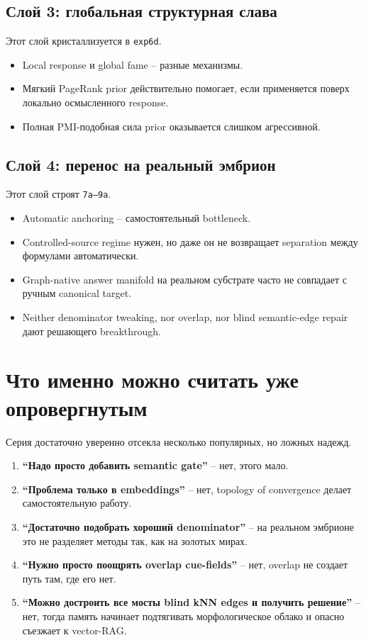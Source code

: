 \subsection{Слой 3: глобальная структурная слава}

Этот слой кристаллизуется в \texttt{exp6d}.

\begin{itemize}[leftmargin=2em]
\item Local response и global fame -- разные механизмы.
\item Мягкий PageRank prior действительно помогает, если применяется поверх
локально осмысленного response.
\item Полная PMI-подобная сила prior оказывается слишком агрессивной.
\end{itemize}

\subsection{Слой 4: перенос на реальный эмбрион}

Этот слой строят \texttt{7a--9a}.

\begin{itemize}[leftmargin=2em]
\item Automatic anchoring -- самостоятельный bottleneck.
\item Controlled-source regime нужен, но даже он не возвращает separation между
формулами автоматически.
\item Graph-native answer manifold на реальном субстрате часто не совпадает с
ручным canonical target.
\item Neither denominator tweaking, nor overlap, nor blind semantic-edge repair
дают решающего breakthrough.
\end{itemize}

\section{Что именно можно считать уже опровергнутым}

Серия достаточно уверенно отсекла несколько популярных, но ложных надежд.

\begin{enumerate}[leftmargin=2em]
\item \textbf{``Надо просто добавить semantic gate''} -- нет, этого мало.
\item \textbf{``Проблема только в embeddings''} -- нет, topology of convergence
делает самостоятельную работу.
\item \textbf{``Достаточно подобрать хороший denominator''} -- на реальном
эмбрионе это не разделяет методы так, как на золотых мирах.
\item \textbf{``Нужно просто поощрять overlap cue-fields''} -- нет, overlap не
создает путь там, где его нет.
\item \textbf{``Можно достроить все мосты blind kNN edges и получить решение''}
-- нет, тогда память начинает подтягивать морфологическое облако и опасно
съезжает к vector-RAG.
\end{enumerate}

